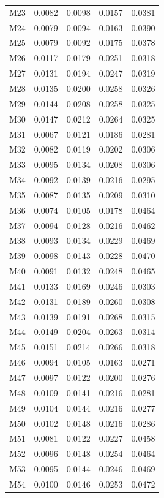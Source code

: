 \begin{longtable}{lrrrr}
M23 & 0.0082 & 0.0098 & 0.0157 & 0.0381 \\
M24 & 0.0079 & 0.0094 & 0.0163 & 0.0390 \\
M25 & 0.0079 & 0.0092 & 0.0175 & 0.0378 \\
M26 & 0.0117 & 0.0179 & 0.0251 & 0.0318 \\
M27 & 0.0131 & 0.0194 & 0.0247 & 0.0319 \\
M28 & 0.0135 & 0.0200 & 0.0258 & 0.0326 \\
M29 & 0.0144 & 0.0208 & 0.0258 & 0.0325 \\
M30 & 0.0147 & 0.0212 & 0.0264 & 0.0325 \\
M31 & 0.0067 & 0.0121 & 0.0186 & 0.0281 \\
M32 & 0.0082 & 0.0119 & 0.0202 & 0.0306 \\
M33 & 0.0095 & 0.0134 & 0.0208 & 0.0306 \\
M34 & 0.0092 & 0.0139 & 0.0216 & 0.0295 \\
M35 & 0.0087 & 0.0135 & 0.0209 & 0.0310 \\
M36 & 0.0074 & 0.0105 & 0.0178 & 0.0464 \\
M37 & 0.0094 & 0.0128 & 0.0216 & 0.0462 \\
M38 & 0.0093 & 0.0134 & 0.0229 & 0.0469 \\
M39 & 0.0098 & 0.0143 & 0.0228 & 0.0470 \\
M40 & 0.0091 & 0.0132 & 0.0248 & 0.0465 \\
M41 & 0.0133 & 0.0169 & 0.0246 & 0.0303 \\
M42 & 0.0131 & 0.0189 & 0.0260 & 0.0308 \\
M43 & 0.0139 & 0.0191 & 0.0268 & 0.0315 \\
M44 & 0.0149 & 0.0204 & 0.0263 & 0.0314 \\
M45 & 0.0151 & 0.0214 & 0.0266 & 0.0318 \\
M46 & 0.0094 & 0.0105 & 0.0163 & 0.0271 \\
M47 & 0.0097 & 0.0122 & 0.0200 & 0.0276 \\
M48 & 0.0109 & 0.0141 & 0.0216 & 0.0281 \\
M49 & 0.0104 & 0.0144 & 0.0216 & 0.0277 \\
M50 & 0.0102 & 0.0148 & 0.0216 & 0.0286 \\
M51 & 0.0081 & 0.0122 & 0.0227 & 0.0458 \\
M52 & 0.0096 & 0.0148 & 0.0254 & 0.0464 \\
M53 & 0.0095 & 0.0144 & 0.0246 & 0.0469 \\
M54 & 0.0100 & 0.0146 & 0.0253 & 0.0472 \\

\end{longtable}
